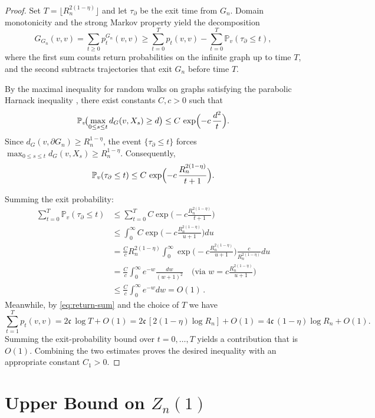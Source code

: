 \documentclass[11pt]{amsart}
\theoremstyle{remark}
\newcommand{\cG}{\mathfrak{c}}      %
\begin{document}
\begin{proof}
 

Set $T = \lfloor R_n^{2(1-\eta)} \rfloor$ and let $\tau_{\partial}$ be the exit time from $G_n$. Domain monotonicity and the strong Markov property yield the decomposition
\[
  G_{G_n}(v,v) = \sum_{t\ge 0} p_t^{G_n}(v,v) \ge \sum_{t=0}^{T} p_t(v,v) - \sum_{t=0}^{T} \mathbb{P}_v(\tau_{\partial} \le t),
\]
where the first sum counts return probabilities on the infinite graph up to time $T$, and the second subtracts trajectories that exit $G_n$ before time $T$.

By the maximal inequality for random walks on graphs satisfying the parabolic Harnack inequality \cite[Corollary 3.3]{Delmotte99}, there exist constants $C,c>0$ such that
\[
  \mathbb{P}_v\!\bigl( \max_{0 \le s \le t} d_G(v,X_s) \ge d \bigr) \le C\,\exp\Bigl(-c\,\frac{d^2}{t}\Bigr).
\]
Since $d_G(v, \partial G_n) \ge R_n^{1-\eta}$, the event $\{\tau_{\partial} \le t\}$ forces $\max_{0 \le s \le t} d_G(v,X_s) \ge R_n^{1-\eta}$. Consequently,
\[
  \mathbb{P}_v(\tau_{\partial} \le t) \le C\,\exp\Bigl(-c\,\frac{R_n^{2(1-\eta)}}{t+1}\Bigr).
\]

Summing the exit probability:
\begin{align*}
  \sum_{t=0}^T \mathbb{P}_v(\tau_{\partial} \le t) 
    &\le \sum_{t=0}^T C \exp\!\Big(-c \frac{R_n^{2(1-\eta)}}{t+1}\Big) \\
    &\le \int_0^\infty C \exp\!\Big(-c \frac{R_n^{2(1-\eta)}}{u+1}\Big) du \\
    &= \frac{C}{c} R_n^{2(1-\eta)} \int_0^\infty \exp\!\Big(-c \frac{R_n^{2(1-\eta)}}{u+1}\Big) \frac{c}{R_n^{2(1-\eta)}} du \\
    &= \frac{C}{c} \int_0^\infty e^{-w} \frac{dw}{(w + 1)^2}  \quad \text{(via } w = c\tfrac{R_n^{2(1-\eta)}}{u+1}\text{)} \\
    &\leq \frac{C}{c} \int_0^\infty e^{-w} dw = O(1)\,.
\end{align*}
Meanwhile, by \eqref{eq:return-sum} and the choice of $T$ we have
\[
  \sum_{t=1}^{T} p_t(v,v)
  = 2\cG\,\log T + O(1) = 2\cG\,[2(1-\eta)\log R_n] + O(1) = 4\cG\,(1-\eta)\log R_n + O(1).
\]
Summing the exit-probability bound over $t=0,\dots,T$ yields a contribution that is $O(1)$.  Combining the two estimates proves the desired inequality with an appropriate constant $C_1>0$.
\end{proof}

\section{Upper Bound on $Z_n(1)$}
\end{document}
